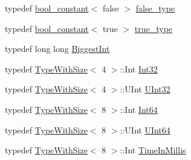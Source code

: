 \begin{DoxyCompactItemize}
\item 
typedef \hyperlink{structtesting_1_1internal_1_1bool__constant}{bool\+\_\+constant}$<$ false $>$ \hyperlink{namespacetesting_1_1internal_abb1d0789f19bdde21affccbd1078b525}{false\+\_\+type}
\item 
typedef \hyperlink{structtesting_1_1internal_1_1bool__constant}{bool\+\_\+constant}$<$ true $>$ \hyperlink{namespacetesting_1_1internal_a62f917c3424d8841de9b49b5ec28edb4}{true\+\_\+type}
\item 
typedef long long \hyperlink{namespacetesting_1_1internal_a05c6bd9ede5ccdf25191a590d610dcc6}{Biggest\+Int}
\item 
typedef \hyperlink{classtesting_1_1internal_1_1TypeWithSize}{Type\+With\+Size}$<$ 4 $>$\+::Int \hyperlink{namespacetesting_1_1internal_a8ee38faaf875f133358abaf9bc056cec}{Int32}
\item 
typedef \hyperlink{classtesting_1_1internal_1_1TypeWithSize}{Type\+With\+Size}$<$ 4 $>$\+::U\+Int \hyperlink{namespacetesting_1_1internal_a40d4fffcd2bf56f18b1c380615aa85e3}{U\+Int32}
\item 
typedef \hyperlink{classtesting_1_1internal_1_1TypeWithSize}{Type\+With\+Size}$<$ 8 $>$\+::Int \hyperlink{namespacetesting_1_1internal_a271c563fec38b804ddab0677f51f70a8}{Int64}
\item 
typedef \hyperlink{classtesting_1_1internal_1_1TypeWithSize}{Type\+With\+Size}$<$ 8 $>$\+::U\+Int \hyperlink{namespacetesting_1_1internal_aa6a1ac454e6d7e550fa4925c62c35caa}{U\+Int64}
\item 
typedef \hyperlink{classtesting_1_1internal_1_1TypeWithSize}{Type\+With\+Size}$<$ 8 $>$\+::Int \hyperlink{namespacetesting_1_1internal_a66a845df404b38fe85c5e14a069f255a}{Time\+In\+Millis}
\end{DoxyCompactItemize}
